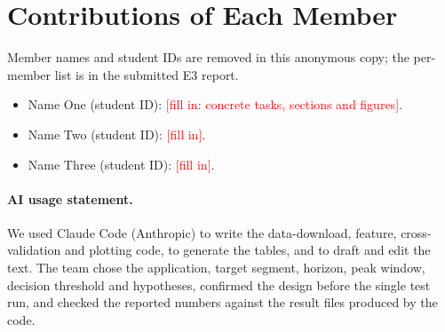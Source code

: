 \section*{Contributions of Each Member}
\ifjudge
Member names and student IDs are removed in this anonymous copy; the per-member list is in the
submitted E3 report.
\else
\begin{itemize}\itemsep0pt
\item Name One (student ID): \textcolor{red}{[fill in: concrete tasks, sections and figures]}.
\item Name Two (student ID): \textcolor{red}{[fill in]}.
\item Name Three (student ID): \textcolor{red}{[fill in]}.
\end{itemize}
\fi

\paragraph{AI usage statement.} We used Claude Code (Anthropic) to write the data-download,
feature, cross-validation and plotting code, to generate the tables, and to draft and edit the
text. The team chose the application, target segment, horizon, peak window, decision threshold
and hypotheses, confirmed the design before the single test run, and checked the reported
numbers against the result files produced by the code.
